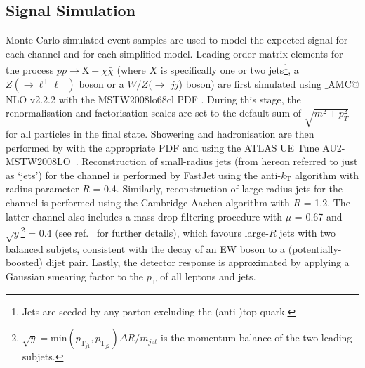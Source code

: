 \subsection{Signal Simulation}
\label{signal_generation}
Monte Carlo simulated event samples are used to model the expected signal for each channel and for each simplified model. Leading order matrix elements for the process $pp \rightarrow \mathrm{X} + \chi\bar{\chi}$ (where $X$ is specifically one or two jets\footnote{Jets are seeded by any parton excluding the (anti-)top quark.}, a $Z(\rightarrow \ell^+ \ell^-)$ boson or a $W/Z(\rightarrow$ $jj$) boson) are first simulated using \MG$\_${\footnotesize A}MC$@$NLO v2.2.2 \cite{MG_aMCNLO2014} with the MSTW2008lo68cl PDF \cite{MSTW}. During this stage, the renormalisation and factorisation scales are set to the default sum of $\sqrt{m^{2} + p_{T}^{2}}$ for all particles in the final state. Showering and hadronisation are then performed by  \cite{} with the appropriate PDF and using the ATLAS UE Tune AU2-MSTW2008LO~\cite{AUtune}. Reconstruction of small-radius jets (from hereon referred to just as `jets') for the \monojet channel is performed by FastJet \cite{} using the anti-$k_{\mathrm{T}}$ algorithm with radius parameter $R$ = 0.4. Similarly, reconstruction of large-radius jets for the \monoWZ channel is performed using the Cambridge-Aachen algorithm with $R$ = 1.2. The latter channel also includes a mass-drop filtering procedure with $\mu$ = 0.67 and $\sqrt{y}$\footnote{$\sqrt{y} = \mathrm{min}(p_{\mathrm{T}_{j1}},p_{\mathrm{T}_{j2}})\Delta R / m_{jet}$ is the momentum balance of the two leading subjets.} = 0.4 (see ref.~\cite{} for further details), which favours large-$R$ jets with two balanced subjets, consistent with the decay of an EW boson to a (potentially-boosted) dijet pair. Lastly, the detector response is approximated by applying a Gaussian smearing factor to the $p_{\mathrm{T}}$ of all leptons and jets.

